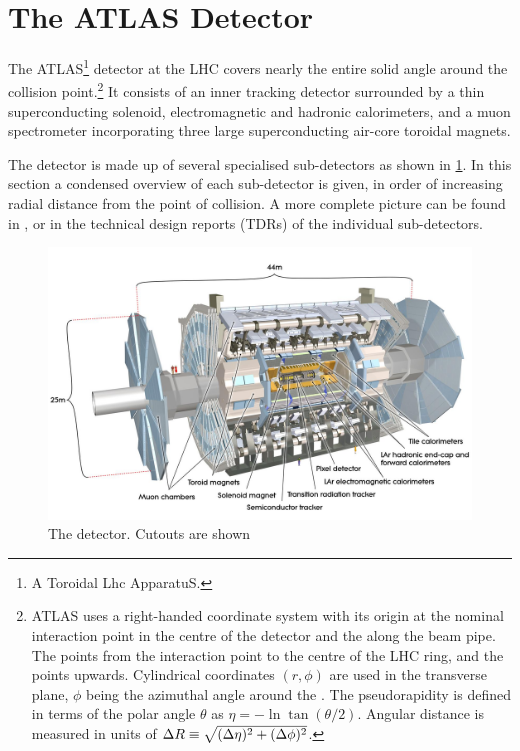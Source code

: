 \section{The ATLAS Detector}\label{sec:atlas_detector}
\newcommand{\AtlasCoordFootnote}{%
ATLAS uses a right-handed coordinate system with its origin at the nominal interaction point in the centre of the detector and the \axis{z} along the beam pipe. The \axis{x} points from the interaction point to the centre of the LHC ring, and the \axis{y} points upwards. Cylindrical coordinates \((r,\phi)\) are used in the transverse plane, \(\phi\) being the azimuthal angle around the \axis{z}. The pseudorapidity is defined in terms of the polar angle \(\theta\) as \(\eta = -\ln \tan(\theta/2)\). Angular distance is measured in units of \(\DeltaR \equiv \sqrt{(\Delta\eta)^{2} + (\Delta\phi)^{2}}\).}

The ATLAS\footnote{A Toroidal Lhc ApparatuS.} detector at the LHC covers nearly the entire solid angle around the collision point.\footnote{\AtlasCoordFootnote}
It consists of an inner tracking detector surrounded by a thin superconducting solenoid, electromagnetic and hadronic calorimeters,
and a muon spectrometer incorporating three large superconducting air-core toroidal magnets.

The detector is made up of several specialised sub-detectors as shown in \cref{fig:atlas_detector}.
In this section a condensed overview of each sub-detector is given, in order of increasing radial distance from the point of collision.
A more complete picture can be found in , or in the technical design reports (TDRs) of the individual sub-detectors.

\begin{figure}[!htpb]
  \centering
  \includegraphics[width=0.9\linewidth]{chapters/2.detector/figs/atlas_detector.jpg}
  \caption{The \ATLAS detector. Cutouts are shown}
  \label{fig:atlas_detector}
\end{figure}
%


